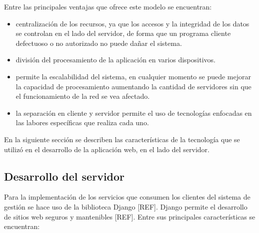 Entre las principales ventajas que ofrece este modelo se encuentran:

\begin{itemize}
    \item centralización de los recursos, ya que los accesos y la integridad de los datos se controlan en el lado del servidor, de forma que un programa cliente defectuoso o no autorizado no puede dañar el sistema.
    \item división del procesamiento de la aplicación en varios dispositivos.
    \item permite la escalabilidad del sistema, en cualquier momento se puede mejorar la capacidad de procesamiento aumentando la cantidad de servidores sin que el funcionamiento de la red se vea afectado.
    \item la separación en cliente y servidor permite el uso de tecnologías enfocadas en las labores específicas que realiza cada uno. 
\end{itemize}
 

En la siguiente sección se describen las características de la tecnología 
que se utilizó en el desarrollo de la aplicación web, en el lado del servidor.

\subsection{Desarrollo del servidor}
Para la implementación de los servicios que consumen los clientes del 
sistema de gestión se hace uso de la biblioteca Django [REF]. Django permite el desarrollo de 
sitios web seguros y mantenibles [REF]. Entre sus principales características
se encuentran:

